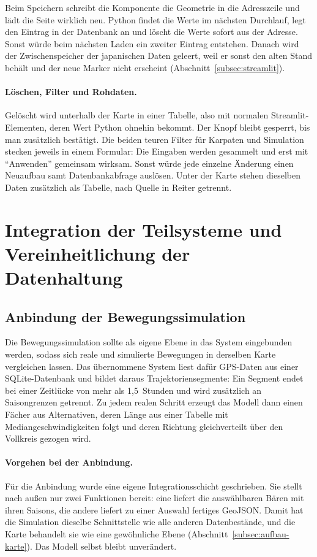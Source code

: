 \documentclass[12pt,a4paper]{report}
\begin{document}
Beim Speichern schreibt die Komponente die Geometrie in die Adresszeile und lädt die Seite
wirklich neu. Python findet die Werte im nächsten Durchlauf, legt den Eintrag in der
Datenbank an und löscht die Werte sofort aus der Adresse. Sonst würde beim nächsten Laden
ein zweiter Eintrag entstehen. Danach wird der Zwischenspeicher der japanischen Daten
geleert, weil er sonst den alten Stand behält und der neue Marker nicht erscheint
(Abschnitt~\ref{subsec:streamlit}).


\paragraph{Löschen, Filter und Rohdaten.} Gelöscht wird unterhalb der Karte in einer
Tabelle, also mit normalen Streamlit-Elementen, deren Wert Python ohnehin bekommt. Der Knopf
bleibt gesperrt, bis man zusätzlich bestätigt. Die beiden teuren Filter für Karpaten und
Simulation stecken jeweils in einem Formular: Die Eingaben werden gesammelt und erst mit
\enquote{Anwenden} gemeinsam wirksam. Sonst würde jede einzelne Änderung einen Neuaufbau
samt Datenbankabfrage auslösen. Unter der Karte stehen dieselben Daten zusätzlich als
Tabelle, nach Quelle in Reiter getrennt.



\section{Integration der Teilsysteme und Vereinheitlichung der Datenhaltung}
\label{sec:integration}
\subsection{Anbindung der Bewegungssimulation}
  \label{subsec:anbindung-simulation}

      Die Bewegungssimulation sollte als eigene Ebene in das System eingebunden
  werden, sodass sich reale und simulierte Bewegungen in derselben Karte
  vergleichen lassen. Das übernommene System liest dafür GPS-Daten aus einer
  SQLite-Datenbank und bildet daraus Trajektoriensegmente: Ein Segment endet bei
  einer Zeitlücke von mehr als 1,5~Stunden und wird zusätzlich an Saisongrenzen
  getrennt. Zu jedem realen Schritt erzeugt das Modell dann einen Fächer aus
  Alternativen, deren Länge aus einer Tabelle mit Mediangeschwindigkeiten folgt
  und deren Richtung gleichverteilt über den Vollkreis gezogen wird.

  \paragraph{Vorgehen bei der Anbindung.} Für die Anbindung wurde eine eigene
  Integrationsschicht geschrieben. Sie stellt nach außen nur zwei Funktionen
  bereit: eine liefert die auswählbaren Bären mit ihren Saisons, die andere
  liefert zu einer Auswahl fertiges GeoJSON. Damit hat die Simulation dieselbe
  Schnittstelle wie alle anderen Datenbestände, und die Karte behandelt sie wie
  eine gewöhnliche Ebene (Abschnitt~\ref{subsec:aufbau-karte}). Das Modell selbst
  bleibt unverändert.
\end{document}

